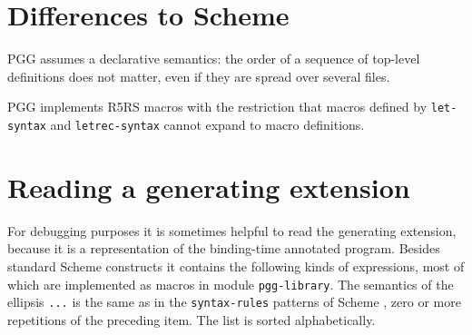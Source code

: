 \documentclass[11pt]{article}
\begin{document}
\section{Differences to Scheme}
\label{sec:differences}

PGG assumes a declarative semantics: the order of a sequence of
top-level definitions does not matter, even if they are spread over
several files.

PGG implements R5RS macros with the restriction that macros defined by
\texttt{let-syntax} and \texttt{letrec-syntax} cannot expand to macro
definitions.


\section{Reading a generating extension}
\label{sec:reading}

For debugging purposes it is sometimes helpful to read the generating
extension, because it is a representation of the binding-time
annotated program. Besides standard Scheme constructs it contains the
following kinds of expressions, most of which are implemented as
macros in module \texttt{pgg-library}. The semantics of the ellipsis
\texttt{...} is the same as in the \texttt{syntax-rules} patterns of
Scheme \cite{KelseyClingerRees1998}, zero or more repetitions of the
preceding item. The list is sorted alphabetically.
\end{document}
